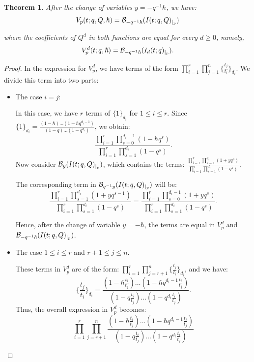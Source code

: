 \documentclass{amsart}
\newtheorem{thm}{Theorem}[section]
\begin{document}
\begin{thm} \label{main thm}
     After the change of variables $y=-q^{-1}\hbar$, we have: 
    \[
    V_p(t;q,Q,\hbar) = \mathcal{B}_{-q^{-1}\hbar}(I(t;q,Q)_{\arrowvert_{p}})
    \]

    where the coefficients of $Q^d$ in both functions are equal for every $d \geq 0$, namely,
    \[
    V_p^d(t;q,\hbar) = \mathcal{B}_{-q^{-1}\hbar}(I_d(t;q)_{\arrowvert_{p}}).
    \]
\end{thm}
\begin{proof}
     In the expression for $V_p^d$, we have terms of the form $\prod_{i=1}^{r}\prod_{j=1}^{n}\{\frac{t_j}{t_i}\}_{d_i}$. We divide this term into two parts:

   \begin{itemize}
       \item The case $i=j$:
       
       In this case, we have $r$ terms of $\{1\}_{d_i}$ for $1 \leq i \leq r$. Since $\{1\}_{d_i} = \frac{(1-\hbar)\dots(1-\hbar q^{d_i-1})}{(1-q)\dots(1-q^{d_i})}$, we obtain:
       \[
       \frac{\prod_{i=1}^r \prod_{s=0}^{d_i-1}(1-\hbar q^s)}{\prod_{i=1}^r \prod_{s=1}^{d_i}(1-q^s)}.
       \]
       Now consider $\mathcal{B}_{y}(I(t;q,Q)_{\arrowvert_{p}})$, which contains the terms: 
       $\frac{\prod_{i=1}^r\prod_{s=1}^{d_i}(1+yq^{s})}{\prod_{i=1 }^r\prod_{s=1}^{d_i}(1-q^{s})}$.
       
       The corresponding term in $\mathcal{B}_{q^{-1}y}(I(t;q,Q)_{\arrowvert_{p}})$ will be:
       \[
       \frac{\prod_{i=1}^r\prod_{s=1}^{d_i}(1+yq^{s-1})}{\prod_{i=1 }^r\prod_{s=1}^{d_i}(1-q^{s})} = \frac{\prod_{i=1}^r\prod_{s=0}^{d_i-1}(1+yq^{s})}{\prod_{i=1 }^r\prod_{s=1}^{d_i}(1-q^{s})}.
       \]
       
       Hence, after the change of variable $y=-\hbar$, the terms are equal in $V_p^d$ and $\mathcal{B}_{-q^{-1}\hbar}(I(t;q,Q)_{\arrowvert_{p}})$.

       \item The case $1 \leq i \leq r$ and $r+1 \leq j \leq n$.
       
       These terms in $V_p^d$ are of the form: $\prod_{i=1}^{r}\prod_{j=r+1}^{n}\{\frac{t_j}{t_i}\}_{d_i}$, and we have:
       \[
       \{\frac{t_j}{t_i}\}_{d_i} = \frac{(1-\hbar \frac{t_i}{t_j})\dots(1- \hbar q^{d_i-1}\frac{t_i}{t_j})}{(1-q \frac{t_i}{t_j})\dots(1-q^{d_i}\frac{t_i}{t_j})}.
       \]
       Thus, the overall expression in $V_p^d$ becomes:
       \[
\prod_{i=1}^r \prod_{j=r+1}^{n} \frac{(1-\hbar \frac{t_i}{t_j})\dots(1- \hbar q^{d_i-1}\frac{t_i}{t_j})}{(1-q \frac{t_i}{t_j})\dots(1-q^{d_i}\frac{t_i}{t_j})}   
       \]


\end{itemize}
\end{proof}
\end{document}

